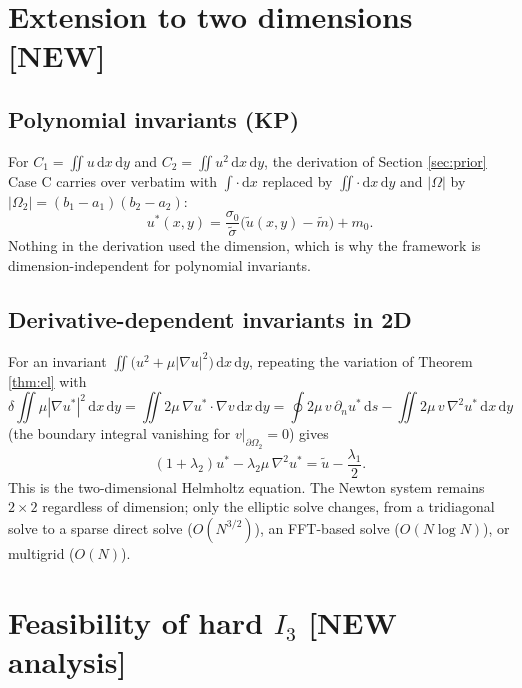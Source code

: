 \documentclass[11pt,a4paper]{article}
\theoremstyle{remark}
\newcommand{\dx}{\,\mathrm{d}x}
\newcommand{\dy}{\,\mathrm{d}y}
\newcommand{\ut}{\tilde{u}}
\newcommand{\us}{u^{*}}
\newcommand{\Om}{\Omega}
\begin{document}
\section{Extension to two dimensions \textbf{[NEW]}}

\subsection{Polynomial invariants (KP)}

For $C_1 = \iint u\dx\dy$ and $C_2 = \iint u^2\dx\dy$, the derivation of
Section \ref{sec:prior} Case C carries over verbatim with $\int\cdot\dx$
replaced by $\iint\cdot\dx\dy$ and $|\Om|$ by $|\Om_2| = (b_1-a_1)(b_2-a_2)$:
\begin{equation}
\us(x,y) = \frac{\sigma_0}{\tilde\sigma}\Big(\ut(x,y) - \tilde m\Big) + m_0 .
\end{equation}
Nothing in the derivation used the dimension, which is why the framework is
dimension-independent for polynomial invariants.

\subsection{Derivative-dependent invariants in 2D}

For an invariant $\iint\big(u^2 + \mu|\nabla u|^2\big)\dx\dy$, repeating the
variation of Theorem \ref{thm:el} with
\begin{equation}
\delta\!\iint \mu|\nabla \us|^2 \dx\dy
= \iint 2\mu\,\nabla \us\cdot\nabla v \dx\dy
= \oint 2\mu\,v\,\partial_n \us \,\mathrm{d}s - \iint 2\mu\,v\,\nabla^2\us\dx\dy
\end{equation}
(the boundary integral vanishing for $v|_{\partial\Om_2}=0$) gives
\begin{equation}
\boxed{\ (1+\lambda_2)\us - \lambda_2\mu\,\nabla^2\us = \ut - \frac{\lambda_1}{2}. \ }
\end{equation}
This is the two-dimensional Helmholtz equation. The Newton system remains
$2\times2$ regardless of dimension; only the elliptic solve changes, from a
tridiagonal solve to a sparse direct solve ($O(N^{3/2})$), an FFT-based solve
($O(N\log N)$), or multigrid ($O(N)$).

\section{Feasibility of hard $I_3$ \textbf{[NEW analysis]}}
\end{document}
